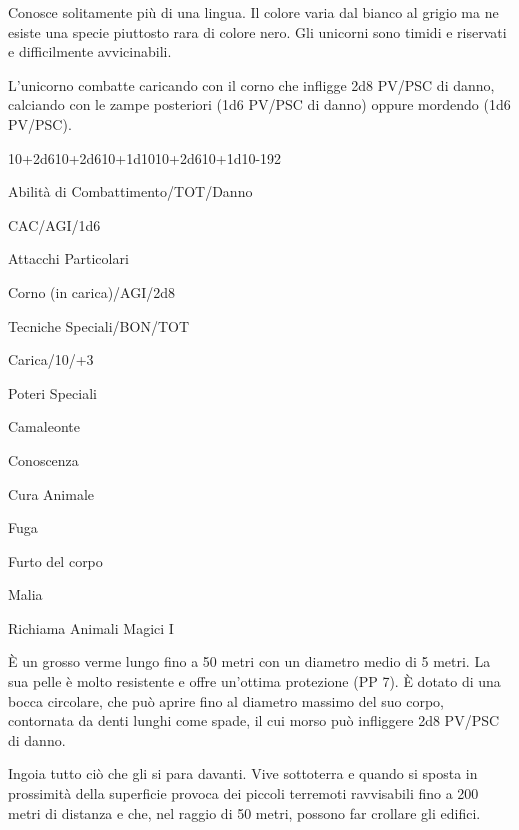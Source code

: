 Conosce solitamente pi\`u di una lingua. Il colore varia dal bianco
al grigio ma ne esiste una specie piuttosto rara di colore nero. Gli
unicorni sono timidi e riservati e difficilmente avvicinabili.

L'unicorno combatte caricando con il corno che infligge 2d8 PV/PSC di
danno, calciando con le zampe posteriori (1d6 PV/PSC di danno) oppure
mordendo (1d6 PV/PSC).

{10+2d6}{10+2d6}{10+1d10}{10+2d6}{10+1d10}{-}{192}

\begin{parmostro}{Abilit\`a di Combattimento/TOT/Danno}
\item CAC/AGI/1d6
\end{parmostro}

\begin{parmostro}{Attacchi Particolari}
\item Corno (in carica)/AGI/2d8
\end{parmostro}

\begin{parmostro}{Tecniche Speciali/BON/TOT}
\item Carica/10/+3
\end{parmostro}

\begin{parmostro}{Poteri Speciali}
\item Camaleonte
\item Conoscenza
\item Cura Animale
\item Fuga
\item Furto del corpo
\item Malia
\item Richiama Animali Magici I
\end{parmostro}


\`E un grosso verme lungo fino a 50 metri con un diametro medio di 5
metri. La sua pelle \`e molto resistente e offre un'ottima
protezione (PP 7). \`E dotato di una bocca circolare, che pu\`o
aprire fino al diametro massimo del suo corpo, contornata da denti
lunghi come spade, il cui morso pu\`o infliggere 2d8 PV/PSC di
danno.


Ingoia tutto ci\`o che gli si para davanti. Vive sottoterra e quando
si sposta in prossimit\`a della superficie provoca dei piccoli
terremoti ravvisabili fino a 200 metri di distanza e che, nel raggio
di 50 metri, possono far crollare gli edifici. 

